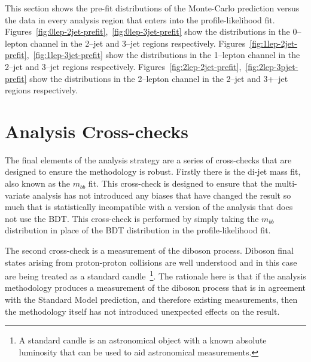 This section shows the pre-fit distributions of the Monte-Carlo prediction
versus the data in every analysis region that enters into the profile-likelihood
fit. Figures~\ref{fig:0lep-2jet-prefit},~\ref{fig:0lep-3jet-prefit} show the
distributions in the 0--lepton channel in the 2--jet and 3--jet regions
respectively. Figures~\ref{fig:1lep-2jet-prefit},~\ref{fig:1lep-3jet-prefit} show the
distributions in the 1--lepton channel in the 2--jet and 3--jet regions
respectively. Figures~\ref{fig:2lep-2jet-prefit},~\ref{fig:2lep-3pjet-prefit} show the
distributions in the 2--lepton channel in the 2--jet and 3+--jet regions
respectively.







\section{Analysis Cross-checks}

The final elements of the analysis strategy are a series of cross-checks that
are designed to ensure the methodology is robust. Firstly there is the di-jet
mass fit, also known as the $m_{bb}$ fit. This cross-check is designed to ensure
that the multi-variate analysis has not introduced any biases that have changed
the result so much that is statistically incompatible with a version of the
analysis that does not use the BDT. This cross-check is performed by simply
taking the $m_{bb}$ distribution in place of the BDT distribution in the
profile-likelihood fit.

The second cross-check is a measurement of the diboson process. Diboson final
states arising from proton-proton collisions are well understood and in this
case are being treated as a standard candle~\footnote{A standard candle is an
  astronomical object with a known absolute luminosity that can be used to aid
  astronomical measurements. }. The rationale here is that if the analysis
methodology produces a measurement of the diboson process that is in agreement
with the Standard Model prediction, and therefore existing measurements, then
the methodology itself has not introduced unexpected effects on the result.

